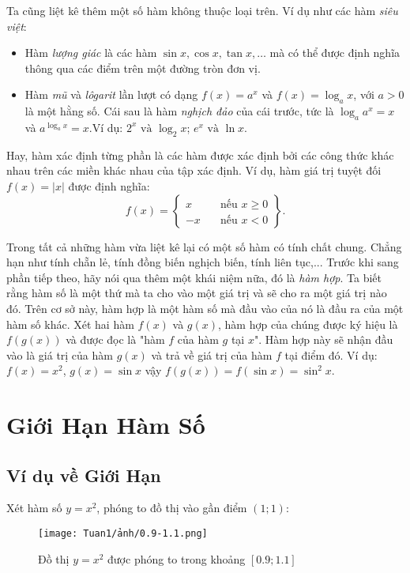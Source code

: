 Ta cũng liệt kê thêm một số hàm không thuộc loại trên.\newline
Ví dụ như các hàm \emph{siêu việt}:\begin{itemize}
    \item Hàm \emph{lượng giác} là các hàm $\sin x,\cos x, \tan x, \dots$ mà có thể được định nghĩa thông qua các điểm trên một đường tròn đơn vị.
    \item Hàm \emph{mũ} và \emph{lôgarit} lần lượt có dạng $f(x) = a^x$ và $f(x) = \log_a x$, với $a > 0$ là một hằng số. Cái sau là hàm \emph{nghịch đảo} của cái trước, tức là $\log_a a^x = x$ và $a^{\log_a x} = x$.\newline Ví dụ: $2^x \text{ và } \log_2 x$; $e^x \text{ và } \ln x$.
\end{itemize}
Hay, hàm xác định từng phần là các hàm được xác định bởi các công thức khác nhau trên các miền khác nhau của tập xác định.\newline
Ví dụ, hàm giá trị tuyệt đối $f(x) = |x|$ được định nghĩa:
\begin{equation*}
    f(x) = \left\{
\begin{aligned}
x  & \quad \text{nếu } x \geq 0 \\
-x   & \quad \text{nếu } x < 0
\end{aligned}
\right\}.
\end{equation*}

Trong tất cả những hàm vừa liệt kê lại có một số hàm có tính chất chung. Chẳng hạn như tính chẵn lẻ, tính đồng biến nghịch biến, tính liên tục,...\newline
Trước khi sang phần tiếp theo, hãy nói qua thêm một khái niệm nữa, đó là \emph{hàm hợp}. Ta biết rằng hàm số là một thứ mà ta cho vào một giá trị và sẽ cho ra một giá trị nào đó. Trên cơ sở này, hàm hợp là một hàm số mà đầu vào của nó là đầu ra của một hàm số khác.\newline
Xét hai hàm $f(x)$ và $g(x)$, hàm hợp của chúng được ký hiệu là $f(g(x))$ và được đọc là "hàm $f$ của hàm $g$ tại $x$". Hàm hợp này sẽ nhận đầu vào là giá trị của hàm $g(x)$ và trả về giá trị của hàm $f$ tại điểm đó.\newline    
Ví dụ: $f(x)=x^2$, $g(x)=\sin x$ vậy $f(g(x))=f(\sin x)=\sin^2 x$.
\section{Giới Hạn Hàm Số}
\subsection{Ví dụ về Giới Hạn}
Xét hàm số $y=x^2$, phóng to đồ thị vào gần điểm $(1;1)$:
\begin{figure}[h!]
    \centering
    \texttt{[image: Tuan1/ảnh/0.9-1.1.png]}
    \caption{Đồ thị \(y=x^2\) được phóng to trong khoảng $[0.9;1.1]$}
    \label{anh3}
\end{figure}

